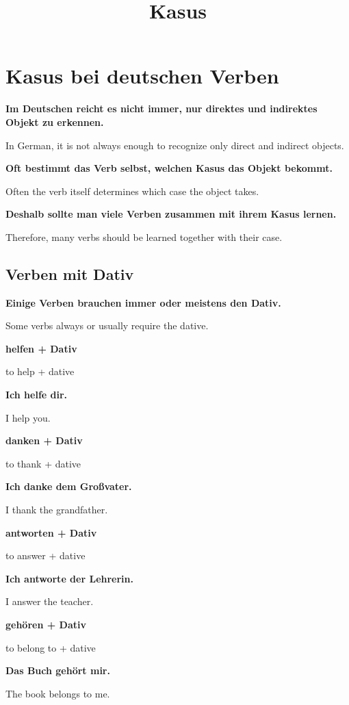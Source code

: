 \documentclass[a4paper]{article}
\title{Kasus}
\date{}
\newcommand{\EN}[1]{\par{\small\textcolor{TranslationGray}{#1}}\vspace{0.4em}}
\begin{document}
    \maketitle
    
    
    \section{Kasus bei deutschen Verben}
        
        \textbf{Im Deutschen reicht es nicht immer, nur direktes und indirektes Objekt zu erkennen.}
        \EN{In German, it is not always enough to recognize only direct and indirect objects.}
        
        \textbf{Oft bestimmt das Verb selbst, welchen Kasus das Objekt bekommt.}
        \EN{Often the verb itself determines which case the object takes.}
        
        \textbf{Deshalb sollte man viele Verben zusammen mit ihrem Kasus lernen.}
        \EN{Therefore, many verbs should be learned together with their case.}
        
        \subsection{Verben mit Dativ}
            
            \textbf{Einige Verben brauchen immer oder meistens den Dativ.}
            \EN{Some verbs always or usually require the dative.}
            
            \textbf{helfen + Dativ}
            \EN{to help + dative}
            
            \textbf{Ich helfe dir.}
            \EN{I help you.}
            
            \textbf{danken + Dativ}
            \EN{to thank + dative}
            
            \textbf{Ich danke dem Großvater.}
            \EN{I thank the grandfather.}
            
            \textbf{antworten + Dativ}
            \EN{to answer + dative}
            
            \textbf{Ich antworte der Lehrerin.}
            \EN{I answer the teacher.}
            
            \textbf{gehören + Dativ}
            \EN{to belong to + dative}
            
            \textbf{Das Buch gehört mir.}
            \EN{The book belongs to me.}
        
\end{document}
